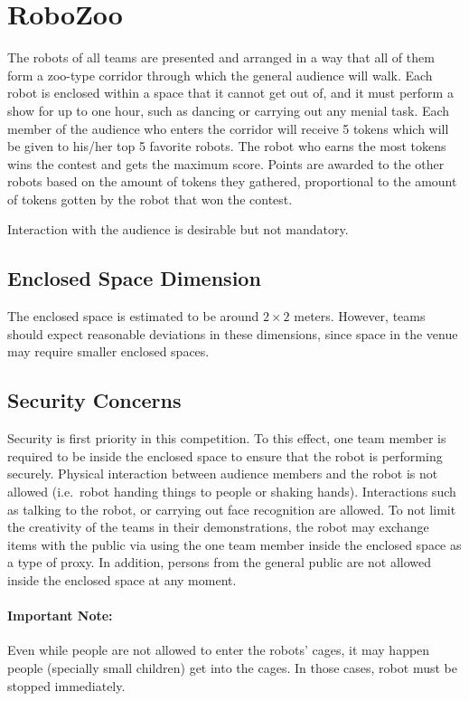 \section{RoboZoo}
\label{sec:test_robo_zoo}

The robots of all teams are presented and arranged in a way that all of them form a zoo-type corridor through which the general audience will walk. 
Each robot is enclosed within a space that it cannot get out of, and it must perform a show for up to one hour, such as dancing or carrying out any menial task. 
Each member of the audience who enters the corridor will receive 5 tokens which will be given to his/her top 5 favorite robots. 
The robot who earns the most tokens wins the contest and gets the maximum score. 
Points are awarded to the other robots based on the amount of tokens they gathered, proportional to the amount of tokens gotten by the robot that won the contest.

Interaction with the audience is desirable but not mandatory.

\subsection{Enclosed Space Dimension}
The enclosed space is estimated to be around $2 \times 2$ meters. However, teams should expect reasonable deviations in these dimensions, since space in the venue may require smaller enclosed spaces.

\subsection{Security Concerns}
Security is first priority in this competition. To this effect, one team member is required to be inside the enclosed space to ensure that the robot is performing securely. 
Physical interaction between audience members and the robot is not allowed (i.e.~robot handing things to people or shaking hands). 
Interactions such as talking to the robot, or carrying out face recognition are allowed. 
To not limit the creativity of the teams in their demonstrations, the robot may exchange items with the public via using the one team member inside the enclosed space as a type of proxy. 
In addition, persons from the general public are not allowed inside the enclosed space at any moment.

\paragraph*{Important Note:} Even while people are not allowed to enter the robots' cages, it may happen people (specially small children) get into the cages. 
  In those cases, robot must be stopped immediately.

